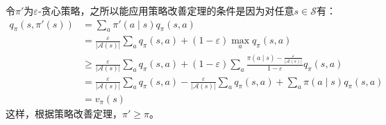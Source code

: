 \documentclass{ctexart}
\begin{document}
令$\pi'$为$\varepsilon$-贪心策略，之所以能应用策略改善定理的条件是因为对任意$s\in\mathcal S$有：
\begin{align*}
q_\pi(s,\pi'(s))
&= \sum_a\pi'(a\mid s)q_\pi(s,a)\\
&= \frac{\varepsilon}{\left\vert \mathcal A(s) \right\vert}\sum_aq_\pi(s,a) + (1-\varepsilon)\max_aq_\pi(s,a)\\
&\ge \frac{\varepsilon}{\left\vert \mathcal A(s) \right\vert}\sum_aq_\pi(s,a) + (1-\varepsilon)\sum_a \frac{\pi(a\mid s)-\frac{\varepsilon}{\left\vert \mathcal A(s) \right\vert}}{1-\varepsilon}q_\pi(s,a)\\
&= \frac{\varepsilon}{\left\vert \mathcal A(s) \right\vert}\sum_aq_\pi(s,a) - \frac{\varepsilon}{\left\vert \mathcal A(s) \right\vert}\sum_aq_\pi(s,a) + \sum_a\pi(a\mid s)q_\pi(s,a)\\
&= v_\pi(s)
\end{align*}
这样，根据策略改善定理，$\pi' \ge \pi$。
\end{document}
